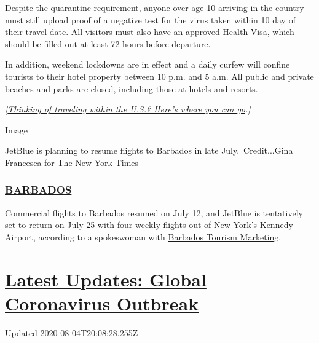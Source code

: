 Despite the quarantine requirement, anyone over age 10 arriving in the
country must still upload proof of a negative test for the virus taken
within 10 day of their travel date. All visitors must also have an
approved Health Visa, which should be filled out at least 72 hours
before departure.

In addition, weekend lockdowns are in effect and a daily curfew will
confine tourists to their hotel property between 10 p.m. and 5 a.m. All
public and private beaches and parks are closed, including those at
hotels and resorts.

\emph{{[}}\href{https://www.nytimes.com/2020/07/10/travel/state-travel-restrictions.html}{\emph{Thinking
of traveling within the U.S.? Here's where you can go}}\emph{.{]}}

Image

JetBlue is planning to resume flights to Barbados in late
July.~Credit...Gina Francesca for The New York Times

\hypertarget{barbados}{%
\subsubsection{\texorpdfstring{\href{https://gisbarbados.gov.bb/blog/commercial-air-traffic-resumes-july-12-with-protocols/}{BARBADOS}}{BARBADOS}}\label{barbados}}

Commercial flights to Barbados resumed on July 12, and JetBlue is
tentatively set to return on July 25 with four weekly flights out of New
York's Kennedy Airport, according to a spokeswoman with
\href{https://www.visitbarbados.org}{Barbados Tourism Marketing}.

\hypertarget{latest-updates-global-coronavirus-outbreak}{%
\section{\texorpdfstring{\href{https://www.nytimes.com/2020/08/04/world/coronavirus-cases.html?action=click\&pgtype=Article\&state=default\&region=MAIN_CONTENT_1\&context=storylines_live_updates}{Latest
Updates: Global Coronavirus
Outbreak}}{Latest Updates: Global Coronavirus Outbreak}}\label{latest-updates-global-coronavirus-outbreak}}

Updated 2020-08-04T20:08:28.255Z

